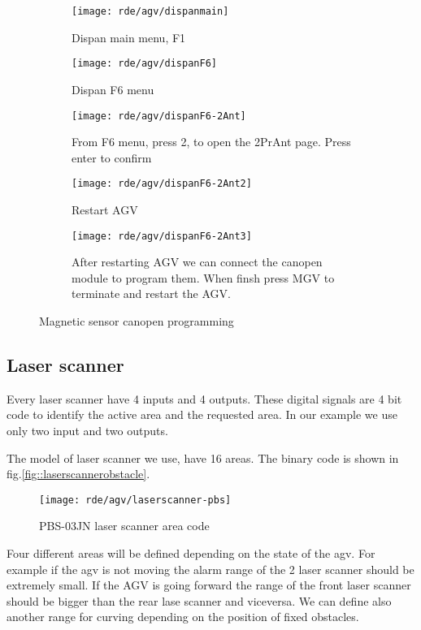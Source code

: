 \begin{figure}[h]
	\centering
	\begin{subfigure}{0.4\textwidth}
		\texttt{[image: rde/agv/dispanmain]}
		\caption{Dispan main menu, F1}
		\label{fig:dispanmain1}
	\end{subfigure}	
	\begin{subfigure}{0.4\textwidth}
		\centering\texttt{[image: rde/agv/dispanF6]}
		\caption{Dispan F6 menu}
		\label{fig:dispanF613}
	\end{subfigure}
	
	\begin{subfigure}{0.4\textwidth}
		\centering\texttt{[image: rde/agv/dispanF6-2Ant]}
		\caption{From F6 menu, press 2, to open the 2PrAnt page. Press enter to confirm}
		\label{fig:dispanF614}
	\end{subfigure}
	\begin{subfigure}{0.4\textwidth}
		\centering\texttt{[image: rde/agv/dispanF6-2Ant2]}
		\caption{Restart AGV}
		\label{fig:dispanF615}
	\end{subfigure}
	\begin{subfigure}{0.4\textwidth}
		\centering\texttt{[image: rde/agv/dispanF6-2Ant3]}
		\caption{After restarting AGV we can connect the canopen module to program them. When finsh press MGV to terminate and restart the AGV.}
		\label{fig:dispanF616}
	\end{subfigure}
	\caption{Magnetic sensor canopen programming}
\label{fig:antprg}
\end{figure}

%
\subsection{Laser scanner}
Every laser scanner have 4 inputs and 4 outputs. These digital signals are 4 bit code to identify the active area and the requested area. In our example we use only two input and two outputs.

The model of laser scanner we use, have 16 areas. The binary code is shown in fig.\ref{fig::laserscannerobstacle}.

\begin{figure}[!]
	\centering\texttt{[image: rde/agv/laserscanner-pbs]}
	\caption{PBS-03JN laser scanner area code}
	\label{fig:laserscannerpbs}
\end{figure}

Four different areas will be defined depending on the state of the agv. For example if the agv is not moving the alarm range of the 2 laser scanner should be extremely small. If the AGV is going forward the range of the front laser scanner should be bigger than the rear lase scanner and viceversa. We can define also another range for curving depending on the position of fixed obstacles.

